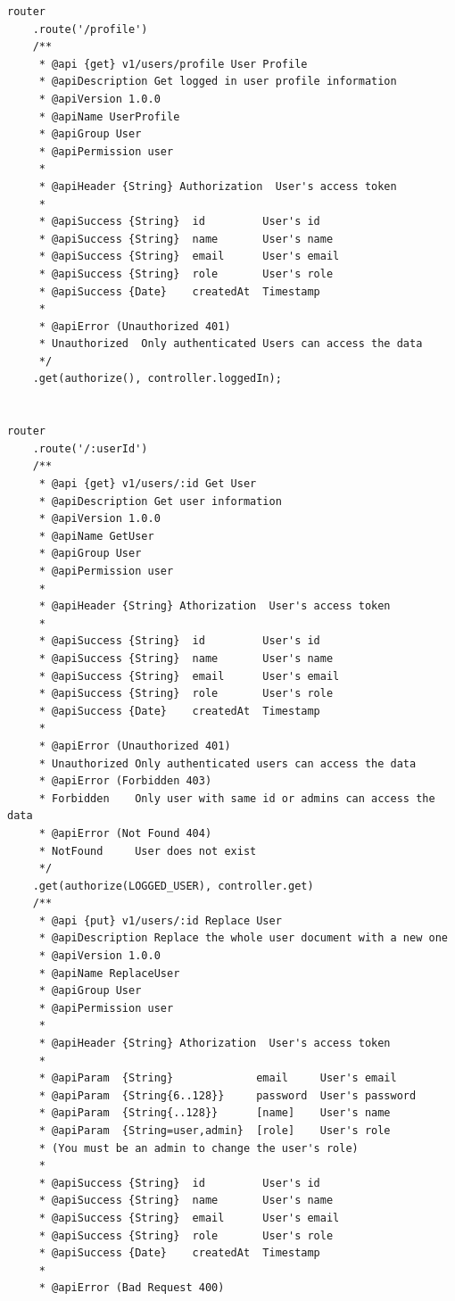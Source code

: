 \documentclass[12pt]{article}
\begin{document}
\begin{verbatim}
router
    .route('/profile')
    /**
     * @api {get} v1/users/profile User Profile
     * @apiDescription Get logged in user profile information
     * @apiVersion 1.0.0
     * @apiName UserProfile
     * @apiGroup User
     * @apiPermission user
     *
     * @apiHeader {String} Authorization  User's access token
     *
     * @apiSuccess {String}  id         User's id
     * @apiSuccess {String}  name       User's name
     * @apiSuccess {String}  email      User's email
     * @apiSuccess {String}  role       User's role
     * @apiSuccess {Date}    createdAt  Timestamp
     *
     * @apiError (Unauthorized 401)  
     * Unauthorized  Only authenticated Users can access the data
     */
    .get(authorize(), controller.loggedIn);


router
    .route('/:userId')
    /**
     * @api {get} v1/users/:id Get User
     * @apiDescription Get user information
     * @apiVersion 1.0.0
     * @apiName GetUser
     * @apiGroup User
     * @apiPermission user
     *
     * @apiHeader {String} Athorization  User's access token
     *
     * @apiSuccess {String}  id         User's id
     * @apiSuccess {String}  name       User's name
     * @apiSuccess {String}  email      User's email
     * @apiSuccess {String}  role       User's role
     * @apiSuccess {Date}    createdAt  Timestamp
     *
     * @apiError (Unauthorized 401) 
     * Unauthorized Only authenticated users can access the data
     * @apiError (Forbidden 403)    
     * Forbidden    Only user with same id or admins can access the data
     * @apiError (Not Found 404)    
     * NotFound     User does not exist
     */
    .get(authorize(LOGGED_USER), controller.get)
    /**
     * @api {put} v1/users/:id Replace User
     * @apiDescription Replace the whole user document with a new one
     * @apiVersion 1.0.0
     * @apiName ReplaceUser
     * @apiGroup User
     * @apiPermission user
     *
     * @apiHeader {String} Athorization  User's access token
     *
     * @apiParam  {String}             email     User's email
     * @apiParam  {String{6..128}}     password  User's password
     * @apiParam  {String{..128}}      [name]    User's name
     * @apiParam  {String=user,admin}  [role]    User's role
     * (You must be an admin to change the user's role)
     *
     * @apiSuccess {String}  id         User's id
     * @apiSuccess {String}  name       User's name
     * @apiSuccess {String}  email      User's email
     * @apiSuccess {String}  role       User's role
     * @apiSuccess {Date}    createdAt  Timestamp
     *
     * @apiError (Bad Request 400)  

\end{verbatim}
\end{document}
